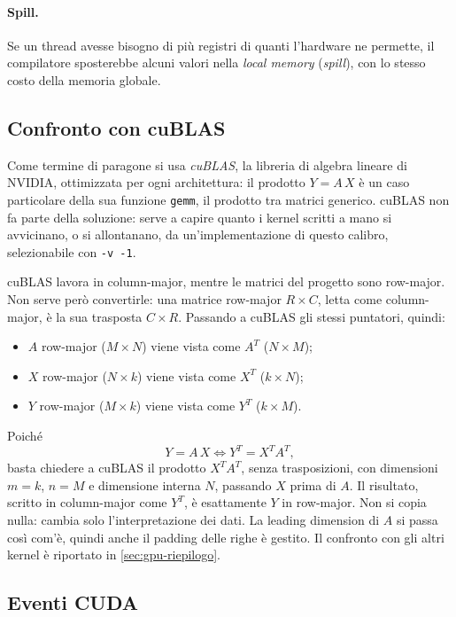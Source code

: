 \documentclass[11pt,a4paper]{article}
\begin{document}
\paragraph{Spill.} Se un thread avesse bisogno di più registri di quanti
l'hardware ne permette, il compilatore sposterebbe alcuni valori nella
\emph{local memory} (\emph{spill}), con lo stesso costo della memoria globale.

\subsection{Confronto con cuBLAS}\label{sec:cublas}

Come termine di paragone si usa \emph{cuBLAS}, la libreria di algebra lineare
di NVIDIA, ottimizzata per ogni architettura: il prodotto $Y = A\,X$ è un caso
particolare della sua funzione \texttt{gemm}, il prodotto tra matrici
generico. cuBLAS non fa parte della soluzione: serve a capire quanto i kernel
scritti a mano si avvicinano, o si allontanano, da un'implementazione
di questo calibro, selezionabile con \texttt{-v -1}.

cuBLAS lavora in column-major, mentre le
matrici del progetto sono row-major. Non serve però convertirle: una matrice
row-major $R \times C$, letta come column-major, è la sua trasposta
$C \times R$. Passando a cuBLAS gli stessi puntatori, quindi:
\begin{itemize}
  \item $A$ row-major ($M \times N$) viene vista come $A^T$ ($N \times M$);
  \item $X$ row-major ($N \times k$) viene vista come $X^T$ ($k \times N$);
  \item $Y$ row-major ($M \times k$) viene vista come $Y^T$ ($k \times M$).
\end{itemize}
Poiché
\[
  Y = A\,X \iff Y^T = X^T A^T,
\]
basta chiedere a cuBLAS il prodotto $X^T A^T$, senza trasposizioni, con
dimensioni $m = k$, $n = M$ e dimensione interna $N$, passando $X$ prima di
$A$. Il risultato, scritto in column-major come $Y^T$, è esattamente $Y$ in
row-major. Non si copia nulla: cambia solo l'interpretazione dei dati. La
leading dimension di $A$ si passa così com'è, quindi anche il padding delle
righe è gestito. Il confronto con gli altri kernel è riportato in
\cref{sec:gpu-riepilogo}.

\subsection{Eventi CUDA}\label{sec:h2d}
\end{document}
